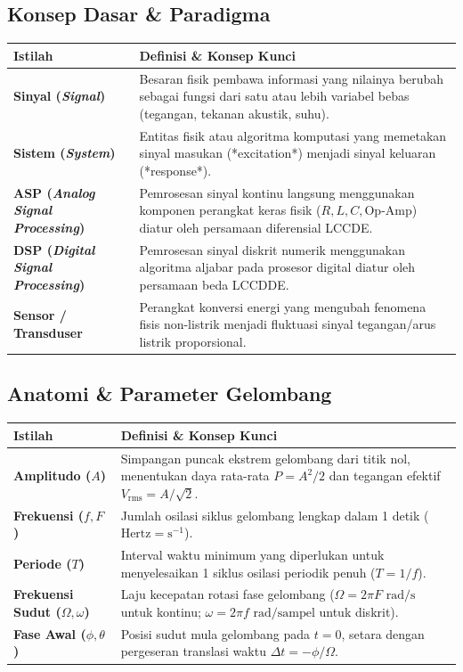 \documentclass[11pt,a4paper]{article}
\begin{document}
\subsection{Konsep Dasar \& Paradigma}
\begin{table}[h!]
\centering
\small
\begin{tabularx}{\textwidth}{l>{\raggedright\arraybackslash}X}
\toprule
\textbf{Istilah} & \textbf{Definisi \& Konsep Kunci} \\
\midrule
\textbf{Sinyal (\textit{Signal})} & Besaran fisik pembawa informasi yang nilainya berubah sebagai fungsi dari satu atau lebih variabel bebas (tegangan, tekanan akustik, suhu). \\
\textbf{Sistem (\textit{System})} & Entitas fisik atau algoritma komputasi yang memetakan sinyal masukan (*excitation*) menjadi sinyal keluaran (*response*). \\
\textbf{ASP (\textit{Analog Signal Processing})} & Pemrosesan sinyal kontinu langsung menggunakan komponen perangkat keras fisik ($R, L, C, \text{Op-Amp}$) diatur oleh persamaan diferensial LCCDE. \\
\textbf{DSP (\textit{Digital Signal Processing})} & Pemrosesan sinyal diskrit numerik menggunakan algoritma aljabar pada prosesor digital diatur oleh persamaan beda LCCDDE. \\
\textbf{Sensor / Transduser} & Perangkat konversi energi yang mengubah fenomena fisis non-listrik menjadi fluktuasi sinyal tegangan/arus listrik proporsional. \\
\bottomrule
\end{tabularx}
\end{table}

\subsection{Anatomi \& Parameter Gelombang}
\begin{table}[h!]
\centering
\small
\begin{tabularx}{\textwidth}{l>{\raggedright\arraybackslash}X}
\toprule
\textbf{Istilah} & \textbf{Definisi \& Konsep Kunci} \\
\midrule
\textbf{Amplitudo ($A$)} & Simpangan puncak ekstrem gelombang dari titik nol, menentukan daya rata-rata $P = A^2/2$ dan tegangan efektif $V_{\text{rms}} = A/\sqrt{2}$. \\
\textbf{Frekuensi ($f, F$)} & Jumlah osilasi siklus gelombang lengkap dalam 1 detik ($\text{Hertz} = \text{s}^{-1}$). \\
\textbf{Periode ($T$)} & Interval waktu minimum yang diperlukan untuk menyelesaikan 1 siklus osilasi periodik penuh ($T = 1/f$). \\
\textbf{Frekuensi Sudut ($\Omega, \omega$)} & Laju kecepatan rotasi fase gelombang ($\Omega = 2\pi F\text{ rad/s}$ untuk kontinu; $\omega = 2\pi f\text{ rad/sampel}$ untuk diskrit). \\
\textbf{Fase Awal ($\phi, \theta$)} & Posisi sudut mula gelombang pada $t = 0$, setara dengan pergeseran translasi waktu $\Delta t = -\phi/\Omega$. \\
\bottomrule
\end{tabularx}
\end{table}
\end{document}
